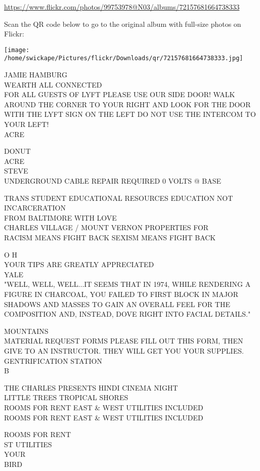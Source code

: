 \documentclass[10pt,letterpaper]{article}
\begin{document}
\url{https://www.flickr.com/photos/99753978@N03/albums/72157681664738333}

Scan the QR code below to go to the original album with full-size photos on Flickr:

\texttt{[image: /home/swickape/Pictures/flickr/Downloads/qr/72157681664738333.jpg]}
\pagebreak

JAMIE HAMBURG\\
WEARTH ALL CONNECTED\\
FOR ALL GUESTS OF LYFT PLEASE USE OUR SIDE DOOR!  WALK AROUND THE CORNER TO YOUR RIGHT AND LOOK FOR THE DOOR WITH THE LYFT SIGN ON THE LEFT DO NOT USE THE INTERCOM TO YOUR LEFT!\\
ACRE

DONUT\\
ACRE\\
STEVE\\
UNDERGROUND CABLE REPAIR REQUIRED 0 VOLTS @ BASE

TRANS STUDENT EDUCATIONAL RESOURCES EDUCATION NOT INCARCERATION\\
FROM BALTIMORE WITH LOVE\\
CHARLES VILLAGE / MOUNT VERNON PROPERTIES FOR\\
RACISM MEANS FIGHT BACK SEXISM MEANS FIGHT BACK

O H\\
YOUR TIPS ARE GREATLY APPRECIATED\\
YALE\\
"WELL, WELL, WELL...IT SEEMS THAT IN 1974, WHILE RENDERING A FIGURE IN CHARCOAL, YOU FAILED TO FIRST BLOCK IN MAJOR SHADOWS AND MASSES TO GAIN AN OVERALL FEEL FOR THE COMPOSITION AND, INSTEAD, DOVE RIGHT INTO FACIAL DETAILS."

MOUNTAINS\\
MATERIAL REQUEST FORMS PLEASE FILL OUT THIS FORM, THEN GIVE TO AN INSTRUCTOR.  THEY WILL GET YOU YOUR SUPPLIES.\\
GENTRIFICATION STATION\\
B

THE CHARLES PRESENTS HINDI CINEMA NIGHT\\
LITTLE TREES TROPICAL SHORES\\
ROOMS FOR RENT EAST \& WEST UTILITIES INCLUDED\\
ROOMS FOR RENT EAST \& WEST UTILITIES INCLUDED

ROOMS FOR RENT\\
ST UTILITIES\\
YOUR\\
BIRD
\end{document}
